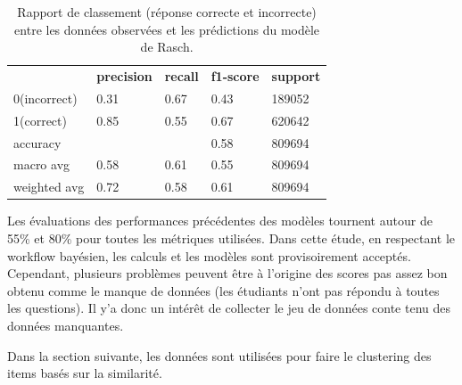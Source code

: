 \begin{table}[H]
	\centering
	\begin{tabular}{m{4cm}m{2cm}m{2cm}m{2cm}m{2cm}}
	& \textbf{precision} & \textbf{recall} & \textbf{f1-score} &  \textbf{support} \\
	
	0(incorrect) & 0.31 & 0.67 & 0.43 & 189052 \\ 
	1(correct) & 0.85 & 0.55 & 0.67 & 620642\\ 
	accuracy &  & & 0.58 & 809694 \\ 
	macro avg  & 0.58 & 0.61 & 0.55 & 809694\\ 
	weighted avg  & 0.72 & 0.58 & 0.61 & 809694\\ 
	\end{tabular}
	\caption{Rapport de classement (réponse correcte et incorrecte) entre les données observées et les prédictions du modèle de Rasch.}
\end{table}

\noindent Les évaluations des performances précédentes des modèles tournent autour de 55\% et 80\% pour toutes les métriques utilisées. Dans cette étude, en respectant le workflow bayésien, les calculs et les modèles sont provisoirement acceptés. Cependant, plusieurs problèmes peuvent être à l’origine des scores pas assez bon obtenu comme le manque de données (les étudiants n’ont pas répondu à toutes les questions). Il y’a donc un intérêt de collecter le jeu de données conte tenu des données manquantes. %

\noindent Dans la section suivante, les données sont utilisées pour faire le clustering des items basés sur la similarité.


